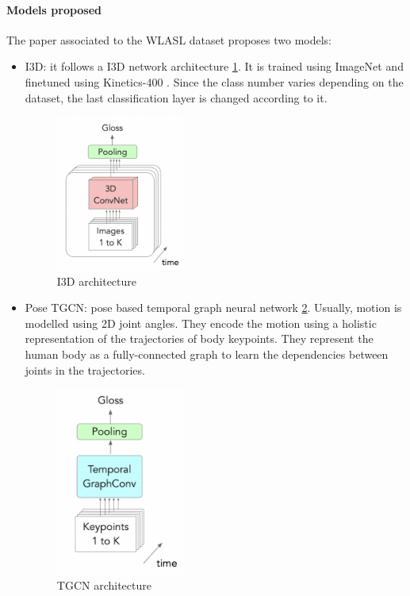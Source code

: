 \paragraph{Models proposed} The paper associated to the WLASL dataset proposes two models:
\begin{itemize}[noitemsep]
    \item I3D: it follows a I3D network architecture \ref{fig:introduction_i3d}. It is trained using ImageNet \cite{ImageNet} 
    and finetuned using Kinetics-400 \cite{Kinetics400}. Since the class number varies depending on
    the dataset, the last classification layer is changed according to it. \\
    \begin{figure}[H]
        \centering
            \includegraphics[width=0.4\textwidth]{assets/i3d.png}
        \caption{I3D architecture}
        \label{fig:introduction_i3d}
    \end{figure}
    \item Pose TGCN: pose based temporal graph neural network \ref{fig:introduction_tgcn}. Usually, motion is modelled using 2D joint angles.
    They encode the motion using a holistic representation of the trajectories of body keypoints. They represent
    the human body as a fully-connected graph to learn the dependencies between joints in the trajectories.
    \begin{figure}[H]
        \centering
            \includegraphics[width=0.4\textwidth]{assets/tgcn.png}
        \caption{TGCN architecture}
        \label{fig:introduction_tgcn}
    \end{figure}
\end{itemize}

